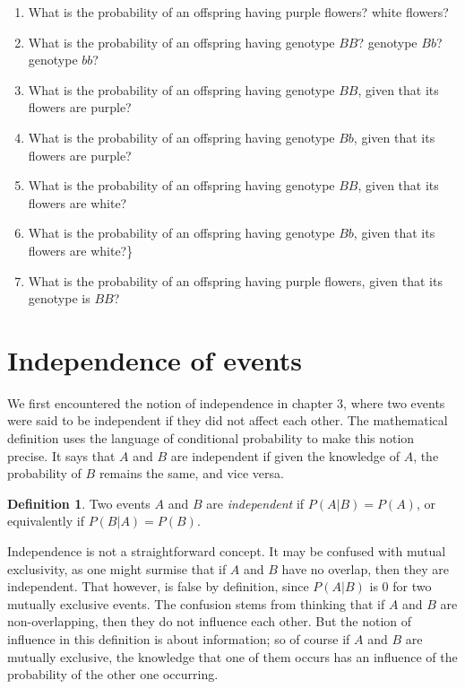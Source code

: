 \documentclass[
]{book}
\theoremstyle{definition}
\newtheorem{definition}{Definition}[chapter]
\theoremstyle{definition}
\theoremstyle{definition}
\theoremstyle{remark}
\begin{document}
\begin{enumerate}
\def\labelenumi{\arabic{enumi}.}
\item
  What is the probability of an offspring having purple flowers? white flowers?
\item
  What is the probability of an offspring having genotype \(BB\)? genotype \(Bb\)? genotype \(bb\)?
\item
  What is the probability of an offspring having genotype \(BB\), given that its flowers are purple?
\item
  What is the probability of an offspring having genotype \(Bb\), given that its flowers are purple?
\item
  What is the probability of an offspring having genotype \(BB\), given that its flowers are white?
\item
  What is the probability of an offspring having genotype \(Bb\), given that its flowers are white?\}
\item
  What is the probability of an offspring having purple flowers, given that its genotype is \(BB\)?
\end{enumerate}

\hypertarget{independence-of-events}{%
\section{Independence of events}\label{independence-of-events}}

We first encountered the notion of independence in chapter 3, where two events were said to be independent if they did not affect each other. The mathematical definition uses the language of conditional probability to make this notion precise. It says that \(A\) and \(B\) are independent if given the knowledge of \(A\), the probability of \(B\) remains the same, and vice versa.

\begin{definition}
\protect\hypertarget{def:def-indep-events}{}{\label{def:def-indep-events} }Two events \(A\) and \(B\) are \emph{independent} if \(P(A|B) = P(A)\), or equivalently if \(P(B|A) = P(B)\).
\end{definition}

Independence is not a straightforward concept. It may be confused with mutual exclusivity, as one might surmise that if \(A\) and \(B\) have no overlap, then they are independent. That however, is false by definition, since \(P(A|B)\) is 0 for two mutually exclusive events. The confusion stems from thinking that if \(A\) and \(B\) are non-overlapping, then they do not influence each other. But the notion of influence in this definition is about information; so of course if \(A\) and \(B\) are mutually exclusive, the knowledge that one of them occurs has an influence of the probability of the other one occurring.
\end{document}
